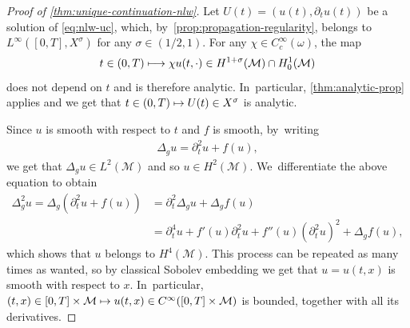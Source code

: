 \documentclass[JEP,XML,SOM,Unicode,published]{cedram}
\newcommand\mto{\mathchoice{\longmapsto}{\mapsto}{\mapsto}{\mapsto}}
\theoremstyle{definition}
\let\mc\mathcal
\newcommand{\M}{\mc{M}}
\begin{document}
\begin{proof}[Proof of \cref{thm:unique-continuation-nlw}] Let $U(t)=(u(t), \partial_t u(t))$ be a solution of \eqref{eq:nlw-uc}, which, by~\cref{prop:propagation-regularity}, belongs to $L^\infty([0, T], X^\sigma)$ for any $\sigma\in (1/2, 1)$. For any $\chi\in C^{\infty}_c(\omega) $, the map
\[
t\in (0, T)\mto \chi u(t,\cdot)\in H^{1+\sigma}(\M)\cap H_0^1(\M)
\]
does not depend on $t$ and is therefore analytic. In~particular, \cref{thm:analytic-prop} applies and we get that $t\in (0, T)\mto U(t)\in X^\sigma$ is analytic.

Since $u$ is smooth with respect to $t$ and $f$ is smooth, by~writing
\begin{align*}
\Delta_g u=\partial_t^2 u+f(u),
\end{align*}
we get that $\Delta_g u\in L^2(\M)$ and so $u\in H^2(\M)$. We~differentiate the above equation to obtain
\begin{align*}
\Delta_g^2 u= \Delta_g (\partial_t^2 u+f(u))&=\partial_t^2 \Delta_g u+\Delta_g f(u)\\
&=\partial_t^4 u+f'(u)\partial_t^2 u+f''(u)(\partial_t^2 u)^2+\Delta_g f(u),
\end{align*}
which shows that $u$ belongs to $H^4(\M)$. This process can be repeated as many times as wanted, so by classical Sobolev embedding we get that $u=u(t, x)$ is smooth with respect to $x$. In~particular, $(t, x)\in [0, T]\times \M\mto u(t, x)\in C^\infty([0, T]\times \M)$ is bounded, together with all its derivatives.


\end{proof}
\end{document}
